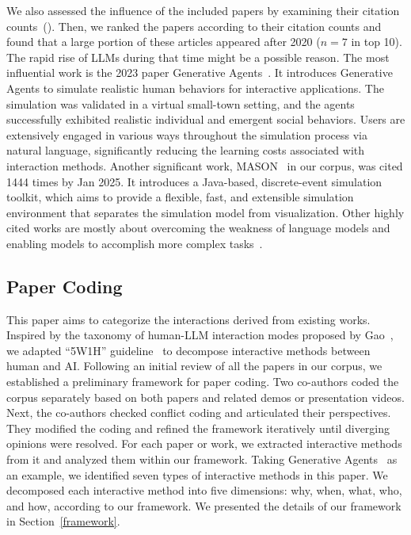 We also assessed the influence of the included papers by examining their citation counts~(). Then, we ranked the papers according to their citation counts and found that a large portion of these articles appeared after 2020 ($n=7$ in top 10). The rapid rise of LLMs during that time might be a possible reason. 
The most influential work is the 2023 paper Generative Agents~\cite{10.1145/3586183.3606763}. It introduces Generative Agents to simulate realistic human behaviors for interactive applications. The simulation was validated in a virtual small-town setting, and the agents successfully exhibited realistic individual and emergent social behaviors.
Users are extensively engaged in various ways throughout the simulation process via natural language, significantly reducing the learning costs associated with interaction methods.
Another significant work, MASON~\cite{doi:10.1177/0037549705058073} in our corpus, was cited 1444 times by Jan 2025. It introduces a Java-based, discrete-event simulation toolkit, which aims to provide a flexible, fast, and extensible simulation environment that separates the simulation model from visualization. 
Other highly cited works are mostly about overcoming the weakness of language models and enabling models to accomplish more complex tasks~\cite{ahn2022icanisay, shridhar2020alfredbenchmarkinterpretinggrounded, hong2024metagptmetaprogrammingmultiagent}.
\subsection{Paper Coding}
This paper aims to categorize the interactions derived from existing works.
Inspired by the taxonomy of human-LLM interaction modes proposed by Gao\etal~\cite{10.1145/3613905.3650786}, we adapted ``5W1H'' guideline~\cite{ram_5ws_2018} to decompose interactive methods between human and AI.
Following an initial review of all the papers in our corpus, we established a preliminary framework for paper coding.
Two co-authors coded the corpus separately based on both papers and related demos or presentation videos.
Next, the co-authors checked conflict coding and articulated their perspectives.
They modified the coding and refined the framework iteratively until diverging opinions were resolved.
For each paper or work, we extracted interactive methods from it and analyzed them within our framework.
Taking Generative Agents~\cite{10.1145/3586183.3606763} as an example,
we identified seven types of interactive methods in this paper.
We decomposed each interactive method into five dimensions: why, when, what, who, and how, according to our framework.
We presented the details of our framework in Section~\ref{framework}.


